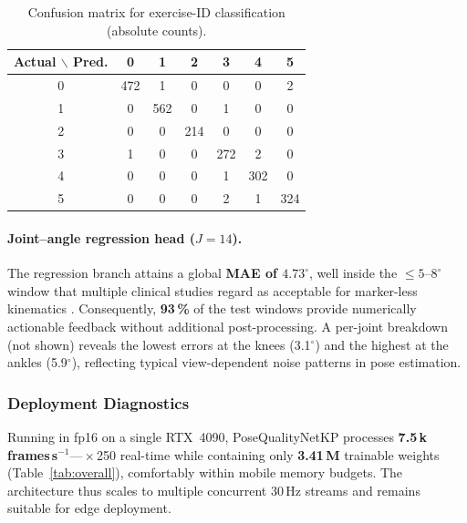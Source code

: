 \documentclass{article}
\begin{document}
\begin{table}[h]
  \centering\small
  \caption{Confusion matrix for exercise-ID classification
           (absolute counts).}
  \label{tab:cm_ex}
  \begin{tabular}{@{}c|cccccc@{}}
    \toprule
    \textbf{Actual $\backslash$ Pred.} & 0 & 1 & 2 & 3 & 4 & 5 \\
    \midrule
      0 & 472 &   1 &   0 &   0 &   0 &   2 \\
      1 &   0 & 562 &   0 &   1 &   0 &   0 \\
      2 &   0 &   0 & 214 &   0 &   0 &   0 \\
      3 &   1 &   0 &   0 & 272 &   2 &   0 \\
      4 &   0 &   0 &   0 &   1 & 302 &   0 \\
      5 &   0 &   0 &   0 &   2 &   1 & 324 \\
    \bottomrule
  \end{tabular}
\end{table}

\paragraph{Joint–angle regression head ($J\!=\!14$).}
The regression branch attains a global \textbf{MAE of $4.73^{\circ}$}, well inside the \mbox{$\le\!5$--$8^{\circ}$} window that
multiple clinical studies regard as acceptable for marker-less
kinematics \cite{McGinley2009Reliability,Hu2021KinectKnee}.  Consequently, \textbf{93\,\%} of the test
windows provide numerically actionable feedback without additional
post-processing.  A per-joint breakdown (not shown) reveals the lowest
errors at the knees (3.1$^{\circ}$) and the highest at the ankles
(5.9$^{\circ}$), reflecting typical view-dependent noise patterns in
pose estimation.

\subsubsection{Deployment Diagnostics}

Running in fp16 on a single RTX~4090, PoseQualityNetKP processes
\textbf{7.5\,k\,frames\,s$^{-1}$}—\(\!\times\)250 real-time while containing only \textbf{3.41\,M} trainable weights (Table~\ref{tab:overall}),
comfortably within mobile memory budgets.  The architecture thus scales to
multiple concurrent 30\,Hz streams and remains suitable for edge
deployment.
\end{document}
